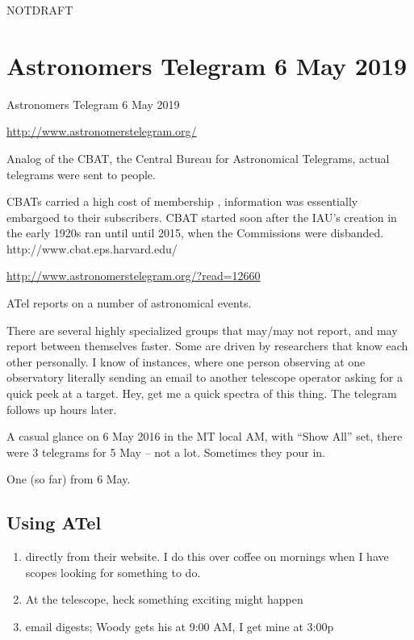 \documentclass[letter,11pt,oneside]{article}
\def\documentisdraft{NOTDRAFT}
\begin{document}

\setcounter{section}{0}

\ifx\documentisdraft\drafttest
\linenumbers    %
\fi

\section{Astronomers Telegram  6 May 2019}
Astronomers Telegram  6 May 2019

\url{http://www.astronomerstelegram.org/}

Analog of the CBAT, the Central Bureau for Astronomical Telegrams,
actual telegrams were sent to people.

CBATs carried a high cost of membership , information was essentially
embargoed to their subscribers.  CBAT started soon after the IAU's
creation in the early 1920s ran until until 2015, when the Commissions
were disbanded. http://www.cbat.eps.harvard.edu/


\url{http://www.astronomerstelegram.org/?read=12660}

ATel reports on a number of astronomical events. 

There are several highly specialized groups that may/may not report,
and may report between themselves faster. Some are driven by
researchers that know each other personally.  I know of instances,
where one person observing at one observatory literally sending an
email to another telescope operator asking for a quick peek at a
target. Hey, get me a quick spectra of this thing. The telegram
follows up hours later.

A casual glance on 6 May 2016 in the MT local AM, with ``Show All''
set, there were 3 telegrams for 5 May -- not a lot. Sometimes they
pour in.

One (so far) from 6 May. 

\subsection{Using ATel}

\vspace{-.15cm}
\begin{enumerate}\addtolength{\itemsep}{-0.5\baselineskip}
   \item   directly from their website. I do this over coffee on mornings when
I have scopes looking for something to do.

   \item   At the telescope, heck something exciting might happen

   \item   email digests; Woody gets his at 9:00 AM, I get mine
at 3:00p
\end{enumerate}
\end{document}
